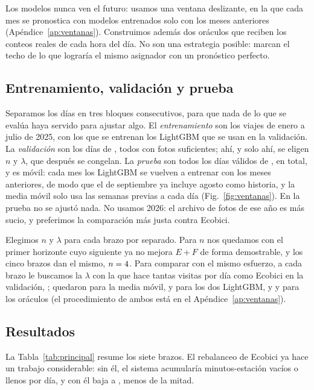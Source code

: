 \documentclass[conference,letterpaper,10pt]{IEEEtran}
\newcommand{\EF}{E+F}
\begin{document}
Los modelos nunca ven el futuro: usamos una ventana deslizante, en la que cada mes se pronostica con modelos entrenados solo con los meses anteriores (Apéndice~\ref{ap:ventanas}). Construimos además dos oráculos que reciben los conteos reales de cada hora del día. No son una estrategia posible: marcan el techo de lo que lograría el mismo asignador con un pronóstico perfecto.

\subsection{Entrenamiento, validación y prueba}\label{sec:calibracion}
Separamos los días en tres bloques consecutivos, para que nada de lo que se evalúa haya servido para ajustar algo. El \emph{entrenamiento} son los viajes de enero a julio de 2025, con los que se entrenan los LightGBM que se usan en la validación. La \emph{validación} son los \rselDias{} días de \rselMes, todos con fotos suficientes; ahí, y solo ahí, se eligen $n$ y $\lambda$, que después se congelan. La \emph{prueba} son todos los días válidos de \rpruebaPeriodo, \rdias{} en total, y es móvil: cada mes los LightGBM se vuelven a entrenar con los \rtrainMeses{} meses anteriores, de modo que el de septiembre ya incluye agosto como historia, y la media móvil solo usa las \rsemanasHist{} semanas previas a cada día (Fig.~\ref{fig:ventanas}). En la prueba no se ajustó nada. No usamos 2026: el archivo de fotos de ese año es más sucio, y preferimos la comparación más justa contra Ecobici.

Elegimos $n$ y $\lambda$ para cada brazo por separado. Para $n$ nos quedamos con el primer horizonte cuyo siguiente ya no mejora $\EF$ de forma demostrable, y los cinco brazos dan el mismo, $n=4$. Para comparar con el mismo esfuerzo, a cada brazo le buscamos la $\lambda$ con la que hace tantas visitas por día como Ecobici en la validación, \rselEcoVis; quedaron \rlamMa{} para la media móvil, \rlamLgbmD{} y \rlamLgbmDir{} para los dos LightGBM, y \rlamOrD{} y \rlamOrDir{} para los oráculos (el procedimiento de ambos está en el Apéndice~\ref{ap:ventanas}).

\subsection{Resultados}
La Tabla~\ref{tab:principal} resume los siete brazos. El rebalanceo de Ecobici ya hace un trabajo considerable: sin él, el sistema acumularía \rbaseEF{} minutos-estación vacíos o llenos por día, y con él baja a \recoEF, menos de la mitad.
\end{document}
